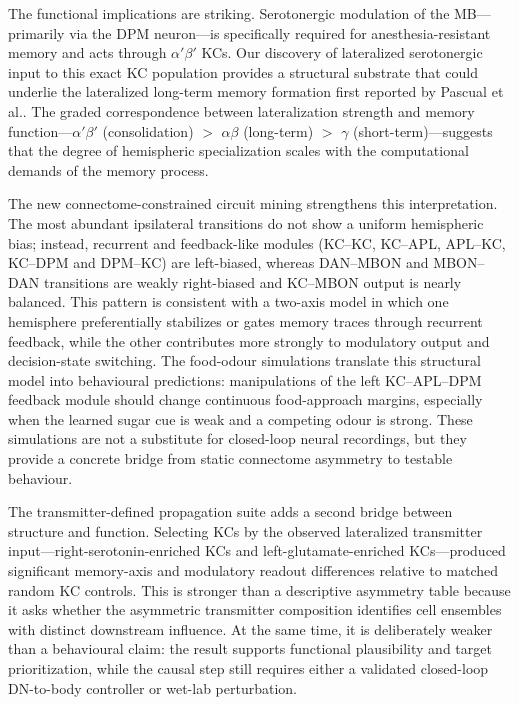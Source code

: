\documentclass[10pt]{article}
\begin{document}
The functional implications are striking. Serotonergic modulation of the MB---primarily via the DPM neuron\cite{keene2006dpm}---is specifically required for anesthesia-resistant memory and acts through $\alpha'\beta'$ KCs\cite{waddell2013serotonin}. Our discovery of lateralized serotonergic input to this exact KC population provides a structural substrate that could underlie the lateralized long-term memory formation first reported by Pascual et al.\cite{pascual2004lateralized}. The graded correspondence between lateralization strength and memory function---$\alpha'\beta'$ (consolidation) $>$ $\alpha\beta$ (long-term) $>$ $\gamma$ (short-term)---suggests that the degree of hemispheric specialization scales with the computational demands of the memory process.

The new connectome-constrained circuit mining strengthens this interpretation. The most abundant ipsilateral transitions do not show a uniform hemispheric bias; instead, recurrent and feedback-like modules (KC--KC, KC--APL, APL--KC, KC--DPM and DPM--KC) are left-biased, whereas DAN--MBON and MBON--DAN transitions are weakly right-biased and KC--MBON output is nearly balanced. This pattern is consistent with a two-axis model in which one hemisphere preferentially stabilizes or gates memory traces through recurrent feedback, while the other contributes more strongly to modulatory output and decision-state switching. The food-odour simulations translate this structural model into behavioural predictions: manipulations of the left KC--APL--DPM feedback module should change continuous food-approach margins, especially when the learned sugar cue is weak and a competing odour is strong. These simulations are not a substitute for closed-loop neural recordings, but they provide a concrete bridge from static connectome asymmetry to testable behaviour.

The transmitter-defined propagation suite adds a second bridge between structure and function. Selecting KCs by the observed lateralized transmitter input---right-serotonin-enriched KCs and left-glutamate-enriched KCs---produced significant memory-axis and modulatory readout differences relative to matched random KC controls. This is stronger than a descriptive asymmetry table because it asks whether the asymmetric transmitter composition identifies cell ensembles with distinct downstream influence. At the same time, it is deliberately weaker than a behavioural claim: the result supports functional plausibility and target prioritization, while the causal step still requires either a validated closed-loop DN-to-body controller or wet-lab perturbation.
\end{document}
